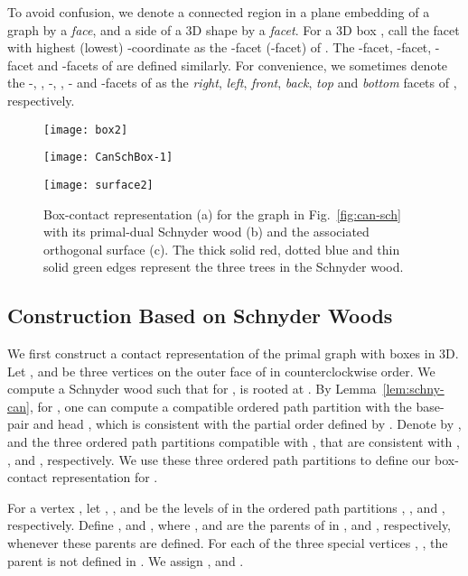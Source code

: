 \documentclass{article}
\newcommand{\df}{\textit}
\begin{document}
To avoid confusion, we denote a connected region in a plane embedding of a graph
 by a \df{face}, and a side of a 3D shape by a \df{facet}. For a 3D box ,
 call the facet with highest (lowest) -coordinate as the -facet (-facet) of .
The -facet, -facet, -facet and -facets of  are defined similarly. For
 convenience, we sometimes denote the -, , -, , - and -facets
 of  as the \df{right}, \df{left}, \df{front}, \df{back}, \df{top} and \df{bottom} facets of , respectively.





\begin{figure}[tb]
\centering
\parbox[t][4.5cm][t]{0.07\textwidth}
{
	\texttt{[image: box2]}
}
\parbox[t][4.5cm][b]{0.62\textwidth}
{
	\texttt{[image: CanSchBox-1]}
}
\parbox[t][4.5cm][t]{0.28\textwidth}
{
	\texttt{[image: surface2]}
}
    \caption{Box-contact representation (a) for the graph in Fig.~\ref{fig:can-sch}
	with its primal-dual Schnyder wood (b) and the associated orthogonal surface (c).
	The thick solid red, dotted blue and thin solid green edges represent the three trees
	in the Schnyder wood.}
    \label{fig:draw}
\end{figure}


\subsection{Construction Based on Schnyder Woods}
\label{sec:mainproof}

We first construct a contact representation  of the primal graph  with boxes in 3D.
 Let ,  and  be three vertices on the outer face of  in counterclockwise order.
 We compute a Schnyder wood  such that for ,  is rooted
 at . By Lemma~\ref{lem:schny-can}, for , one can compute a compatible ordered path
 partition with the base-pair  and head , which is consistent with the partial order
 defined by . Denote by
 ,  and  the three ordered path partitions compatible with , that
 are consistent with , , and , respectively. We use these three ordered path partitions
 to define our box-contact representation for .

 For a vertex , let , , and  be the levels of  in the ordered path
 partitions , , and , respectively. Define ,  and
 , where ,  and  are the parents of  in ,  and ,
 respectively, whenever these parents are defined. For each of the three special vertices ,
 , the parent is not defined in . We assign ,  and
 .
\end{document}
